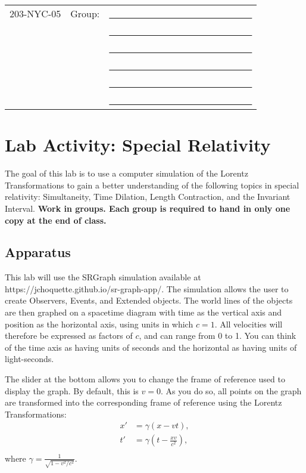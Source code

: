 \documentclass{article}
\begin{document}
\begin{tabularx}{\textwidth}{Xll}
203-NYC-05&Group:&\underline{~~~~~~~~~~~~~~~~~~~~~~~~~~~~~~}\\
&&\underline{~~~~~~~~~~~~~~~~~~~~~~~~~~~~~~}\\
&&\underline{~~~~~~~~~~~~~~~~~~~~~~~~~~~~~~}\\
&&\underline{~~~~~~~~~~~~~~~~~~~~~~~~~~~~~~}\\
&&\underline{~~~~~~~~~~~~~~~~~~~~~~~~~~~~~~}\\
&&\underline{~~~~~~~~~~~~~~~~~~~~~~~~~~~~~~}\\
\end{tabularx}

\section*{Lab Activity: Special Relativity}

The goal of this lab is to use a computer simulation of the Lorentz Transformations to gain a better understanding of the following topics in special relativity: Simultaneity, Time Dilation, Length Contraction, and the Invariant Interval. \textbf{Work in groups. Each group is required to hand in only one copy at the end of class.}

\subsection*{Apparatus}

This lab will use the SRGraph simulation available at https://jchoquette.github.io/sr-graph-app/. The simulation allows the user to create Observers, Events, and Extended objects. The world lines of the objects are then graphed on a spacetime diagram with time as the vertical axis and position as the horizontal axis, using units in which $c=1$. All velocities will therefore be expressed as factors of $c$, and can range from 0 to 1. You can think of the time axis as having units of seconds and the horizontal as having units of light-seconds.

The slider at the bottom allows you to change the frame of reference used to display the graph. By default, this is $v=0$. As you do so, all points on the graph are transformed into the corresponding frame of reference using the Lorentz Transformations:
\begin{align*}
x'&=\gamma\left(x-vt\right),\\
t'&=\gamma\left(t-\frac{xv}{c^2}\right),\\
\end{align*}
where $\gamma=\frac{1}{\sqrt{1-v^2/c^2}}$.
\end{document}
